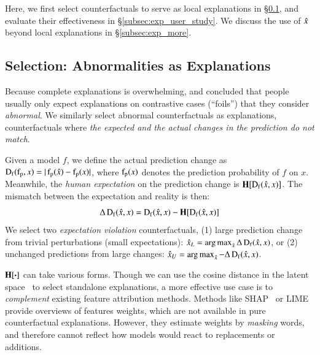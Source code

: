 Here, we first select counterfactuals to serve as local explanations in \S\ref{subsec:local_explain}, and evaluate their effectiveness in \S\ref{subsec:exp_user_study}.
We discuss the use of $\hat{x}$ beyond local explanations in \S\ref{subsec:exp_more}.

\subsection{Selection: Abnormalities as Explanations}
\label{subsec:local_explain}




Because complete explanations is overwhelming, and \citet{miller} concluded that people usually only expect explanations on contrastive cases (``foils'') that they consider \emph{abnormal}.
We similarly select abnormal counterfactuals as explanations, \ie counterfactuals where \emph{the expected and the actual changes in the prediction do not match}.

Given a model $f$, we define the actual prediction change as $\operatorname*{D_f}(\operatorname*{f_p}, x)=|\operatorname*{f_p}(\hat{x})-\operatorname*{f_p}(x)|$, where $\operatorname*{f_p}(x)$ denotes the prediction probability of $f$ on $x$.
Meanwhile, the \emph{human expectation} on the prediction change is $\operatorname*{\mathbf{H}}[\operatorname*{D_f}(\hat{x}, x)]$.
The mismatch between the expectation and reality is then:
$$\Delta\operatorname*{D_f}(\hat{x}, x) = \operatorname*{D_f}(\hat{x}, x)-\operatorname*{\mathbf{H}}[\operatorname*{D_f}(\hat{x}, x)]$$
We select two \emph{expectation violation} counterfactuals, \ie (1) large prediction change from trivial perturbations (small expectations): $\hat{x}_L = \operatorname*{arg\,max}_{\hat{x}} \Delta\operatorname*{D_f}(\hat{x}, x)$, or (2) unchanged predictions from large changes: $\hat{x}_U = \operatorname*{arg\,max}_{\hat{x}} -\Delta\operatorname*{D_f}(\hat{x}, x)$. 


$\operatorname*{\mathbf{H}}[\boldsymbol{\cdot}]$ can take various forms.
Though we can use the cosine distance in the latent space~\cite{reimers-2019-sentence-bert} to select standalone explanations, a more effective use case is to \emph{complement} existing feature attribution methods.
Methods like SHAP~\cite{NIPS2017_7062} or LIME~\cite{Ribeiro2016WhySI} provide overviews of features weights, which are not available in pure counterfactual explanations.
However, they estimate weights by \emph{masking} words, and therefore cannot reflect how models would react to replacements or additions.

